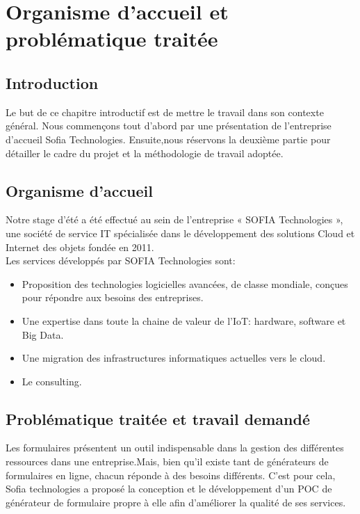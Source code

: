 \chapter{Organisme d’accueil et problématique traitée}

\section{Introduction}
Le but de ce chapitre introductif est de mettre le travail dans son contexte général. Nous commençons tout d’abord par une présentation de l’entreprise d’accueil Sofia Technologies. Ensuite,nous réservons la deuxième partie pour détailler le cadre du projet et la méthodologie de travail adoptée.
\section{Organisme d'accueil}
Notre stage d’été a été effectué au sein de l’entreprise « SOFIA Technologies », une société de service {\@ IT} spécialisée dans le développement des solutions Cloud et Internet des objets fondée en 2011.\\
Les services développés par SOFIA Technologies sont: 
\begin{itemize}
\item Proposition des technologies logicielles avancées, de classe mondiale, conçues pour répondre aux besoins des entreprises.
\item  Une expertise dans toute la chaine de valeur de l’IoT: hardware, software et Big Data.
\item Une migration des infrastructures informatiques actuelles vers le cloud.
\item Le consulting.
\end{itemize}

\section{Problématique traitée et travail demandé}
Les formulaires présentent un outil indispensable dans la gestion des différentes ressources dans une entreprise.Mais, bien qu'il existe tant de générateurs de formulaires en ligne, chacun réponde à des besoins différents.
C'est pour cela, Sofia technologies a proposé la conception et le développement d'un POC de générateur de formulaire propre à elle afin d'améliorer la qualité de ses services.
